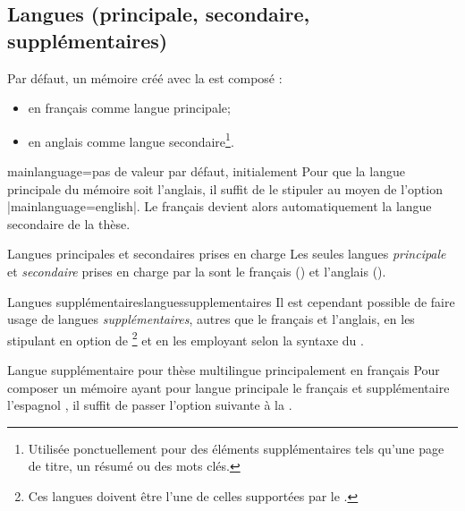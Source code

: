 %

\subsection{Langues (principale, secondaire,
  supplémentaires)}\label{sec-langues}

Par défaut, un mémoire créé avec la \yatcl est composé :
\begin{itemize}
\item en français comme langue principale;
\item en anglais comme langue secondaire\footnote{Utilisée ponctuellement pour
    des éléments supplémentaires tels qu'une page de titre, un résumé ou des
    mots clés.}.
\end{itemize}
%
\begin{docKey}{mainlanguage}{=\textbar{}}{pas
    de valeur par défaut, initialement }
  Pour que la langue principale  du mémoire soit
  l'anglais, il suffit de le stipuler au moyen de l'option
  |mainlanguage=english|. Le français devient alors automatiquement la langue
  secondaire de la thèse.
\end{docKey}

\begin{dbwarning}{Langues principales et secondaires prises en charge}{}
  Les seules langues \emph{principale} et \emph{secondaire} prises en charge
  par la \yatcl sont le français () et l'anglais
  ().
\end{dbwarning}

\begin{dbremark}{Langues supplémentaires}{languessupplementaires}
  Il est cependant possible de faire usage de langues \emph{supplémentaires},
  autres que le français et l'anglais, en les stipulant en option de
  \footnote{Ces langues doivent être l'une de
    celles supportées par le .} et en les employant selon la
  syntaxe du .
\end{dbremark}

\begin{dbexample}{Langue supplémentaire pour thèse
    multilingue principalement en français}{}
  Pour composer un mémoire ayant pour langue principale le français et
  supplémentaire l'espagnol , il suffit de passer l'option suivante à la \yatcl{}.
\end{dbexample}

